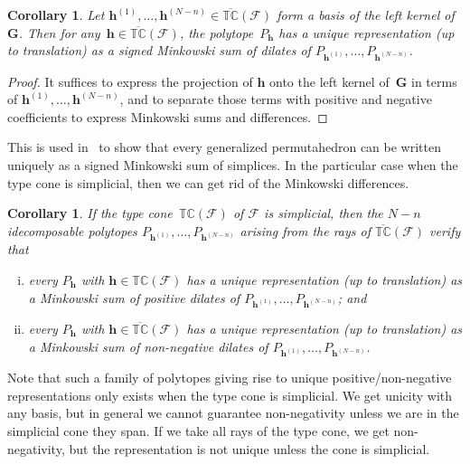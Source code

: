 \documentclass{amsart}
\newtheorem{corollary}[theorem]{Corollary}
\theoremstyle{definition}
\renewcommand{\b}[1]{{\boldsymbol{#1}}} %
\newcommand{\Fan}{\mathcal{F}} %
\newcommand{\typeCone}{\mathbb{TC}} %
\newcommand{\ctypeCone}{\overline{\mathbb{TC}}} %
\begin{document}
\begin{corollary}
Let $\b{h}^{(1)},\dots, \b{h}^{(N-n)}\in \ctypeCone(\Fan)$ form a basis of the left kernel of~$\b{G}$. Then for any~$\b{h} \in \ctypeCone(\Fan)$, the polytope~$P_\b{h}$ has a unique representation (up to translation) as a signed Minkowski sum of dilates of $P_{\b{h}^{(1)}}, \dots, P_{\b{h}^{(N-n)}}$.
\end{corollary}
\begin{proof}
It suffices to express the projection of $\b{h}$ onto the left kernel of~$\b{G}$ in terms of $\b{h}^{(1)}, \dots, \b{h}^{(N-n)}$, and to separate those terms with positive and negative coefficients to express Minkowski sums and differences.
\end{proof}

This is used in~\cite{ArdilaBenedettiDoker} to show that every generalized permutahedron can be written uniquely as a signed Minkowski sum of simplices. 
In the particular case when the type cone is simplicial, then we can get rid of the Minkowski differences.

\begin{corollary}
If the type cone~$\typeCone(\Fan)$ of $\Fan$ is simplicial, then the $N-n$ idecomposable polytopes $P_{\b{h}^{(1)}}, \dots, P_{\b{h}^{(N-n)}}$ arising from the rays of $\ctypeCone(\Fan)$ verify that 
\begin{enumerate}[(i)]
\item  every $P_\b{h}$ with $\b{h}\in \typeCone(\Fan)$ has a unique representation (up to translation) as a Minkowski sum of positive dilates of $P_{\b{h}^{(1)}}, \dots, P_{\b{h}^{(N-n)}}$; and
\item  every $P_\b{h}$ with $\b{h}\in \ctypeCone(\Fan)$ has a unique representation (up to translation) as a Minkowski sum of non-negative dilates of $P_{\b{h}^{(1)}}, \dots, P_{\b{h}^{(N-n)}}$.
\end{enumerate} 
\end{corollary}

Note that such a family of polytopes giving rise to unique positive/non-negative representations only exists when the type cone is simplicial. We get unicity with any basis, but in general we cannot guarantee non-negativity unless we are in the simplicial cone they span. If we take all rays of the type cone, we get non-negativity, but the representation is not unique unless the cone is simplicial.
\end{document}
